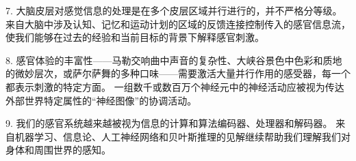 7. 大脑皮层对感觉信息的处理是在多个皮层区域并行进行的，并不严格分等级。 
来自大脑中涉及认知、记忆和运动计划的区域的反馈连接控制传入的感官信息流，使我们能够在过去的经验和当前目标的背景下解释感官刺激。 


8. 感官体验的丰富性——马勒交响曲中声音的复杂性、大峡谷景色中色彩和质地的微妙层次，或萨尔萨舞的多种口味——需要激活大量并行作用的感受器，每一个都表示刺激的特定方面。 
一组数千或数百万个神经元中的神经活动应被视为传达外部世界特定属性的“神经图像”的协调活动。 


9. 我们的感官系统越来越被视为信息的计算和算法编码器、处理器和解码器。 
来自机器学习、信息论、人工神经网络和贝叶斯推理的见解继续帮助我们理解我们对身体和周围世界的感知。

